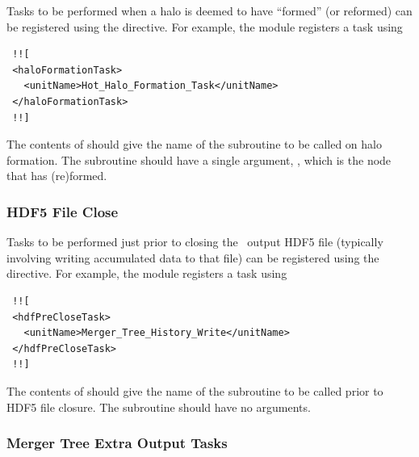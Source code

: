 Tasks to be performed when a halo is deemed to have ``formed'' (or reformed) can be registered using the  directive. For example, the  module registers a task using
\begin{verbatim}
 !![
 <haloFormationTask>
   <unitName>Hot_Halo_Formation_Task</unitName>
 </haloFormationTask>
 !!]
\end{verbatim}
The contents of  should give the name of the subroutine to be called on halo formation. The subroutine should have a single argument, , which is the node that has (re)formed.

\subsubsection{HDF5 File Close}\label{sec:HDFFileClose}

Tasks to be performed just prior to closing the \glc\ output HDF5 file (typically involving writing accumulated data to that file) can be registered using the  directive. For example, the  module registers a task using
\begin{verbatim}
 !![
 <hdfPreCloseTask>
   <unitName>Merger_Tree_History_Write</unitName>
 </hdfPreCloseTask>
 !!]
\end{verbatim}
The contents of  should give the name of the subroutine to be called prior to HDF5 file closure. The subroutine should have no arguments.

\subsubsection{Merger Tree Extra Output Tasks}

